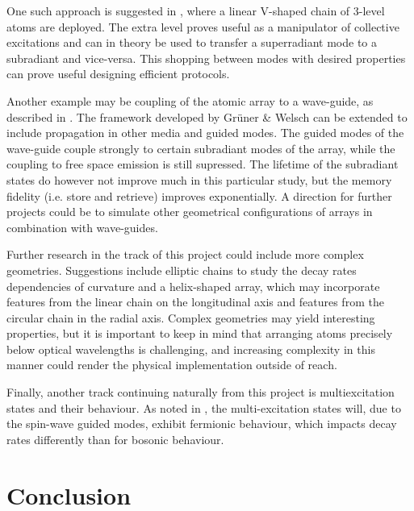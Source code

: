 \documentclass{article}
\begin{document}
One such approach is suggested in \cite{Fayard}, where a linear V-shaped chain of 3-level atoms are deployed. The extra level proves useful as a manipulator of collective excitations and can in theory be used to transfer a superradiant mode to a subradiant and vice-versa. This shopping between modes with desired properties can prove useful designing efficient protocols. 

Another example may be coupling of the atomic array to a wave-guide, as described in \cite[Section IV]{Asenjo}. The framework developed by Grüner \& Welsch \cite{Gruner} can be extended to include propagation in other media and guided modes. The guided modes of the wave-guide couple strongly to certain subradiant modes of the array, while the coupling to free space emission is still supressed. The lifetime of the subradiant states do however not improve much in this particular study, but the memory fidelity (i.e. store and retrieve) improves exponentially. A direction for further projects could be to simulate other geometrical configurations of arrays in combination with wave-guides. 

Further research in the track of this project could include more complex geometries. Suggestions include elliptic chains to study the decay rates dependencies of curvature and a helix-shaped array, which may incorporate features from the linear chain on the longitudinal axis and features from the circular chain in the radial axis. Complex geometries may yield interesting properties, but it is important to keep in mind that arranging atoms precisely below optical wavelengths is challenging, and increasing complexity in this manner could render the physical implementation outside of reach. 

Finally, another track continuing naturally from this project is multiexcitation states and their behaviour. As noted in \cite{Asenjo}, the multi-excitation states will, due to the spin-wave guided modes, exhibit fermionic behaviour, which impacts decay rates differently than for bosonic behaviour. 

\section{Conclusion}
\end{document}
